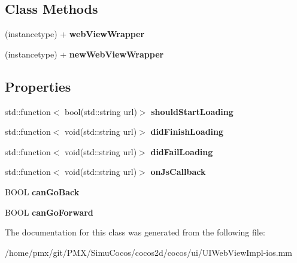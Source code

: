 \subsection*{Class Methods}
\begin{DoxyCompactItemize}
\item 
\mbox{\label{interfaceUIWebViewWrapper_a05d40bb991de50059e6b78d13503352b}} 
(instancetype) + {\bfseries web\+View\+Wrapper}
\item 
\mbox{\label{interfaceUIWebViewWrapper_abbb2ae340d62cbe4829d4753486b1765}} 
(instancetype) + {\bfseries new\+Web\+View\+Wrapper}
\end{DoxyCompactItemize}
\subsection*{Properties}
\begin{DoxyCompactItemize}
\item 
\mbox{\label{interfaceUIWebViewWrapper_a786e73a2fdb3491ff096c85a59cd02c0}} 
std\+::function$<$ bool(std\+::string url)$>$ {\bfseries should\+Start\+Loading}
\item 
\mbox{\label{interfaceUIWebViewWrapper_ac765d9968381c09826be7f53f0bfcc2b}} 
std\+::function$<$ void(std\+::string url)$>$ {\bfseries did\+Finish\+Loading}
\item 
\mbox{\label{interfaceUIWebViewWrapper_ab9c400e8243b17e16bf8db020484e2d4}} 
std\+::function$<$ void(std\+::string url)$>$ {\bfseries did\+Fail\+Loading}
\item 
\mbox{\label{interfaceUIWebViewWrapper_a147d893318a49230de91cf7a9c0e94f1}} 
std\+::function$<$ void(std\+::string url)$>$ {\bfseries on\+Js\+Callback}
\item 
\mbox{\label{interfaceUIWebViewWrapper_a0034f28d9bebc5ed7618914948c7e761}} 
B\+O\+OL {\bfseries can\+Go\+Back}
\item 
\mbox{\label{interfaceUIWebViewWrapper_a29bb2bec551af98fb4f4a897370c09f5}} 
B\+O\+OL {\bfseries can\+Go\+Forward}
\end{DoxyCompactItemize}


The documentation for this class was generated from the following file\+:\begin{DoxyCompactItemize}
\item 
/home/pmx/git/\+P\+M\+X/\+Simu\+Cocos/cocos2d/cocos/ui/U\+I\+Web\+View\+Impl-\/ios.\+mm\end{DoxyCompactItemize}
